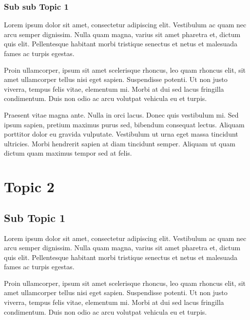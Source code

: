 \documentclass[12pt,a4paper]{report}
\begin{document}
\subsubsection{Sub sub Topic 1}

\begin{gbox}
Lorem ipsum dolor sit amet, consectetur adipiscing elit. Vestibulum ac quam nec arcu semper dignissim. Nulla quam magna, varius sit amet pharetra et, dictum quis elit. Pellentesque habitant morbi tristique senectus et netus et malesuada fames ac turpis egestas.
\end{gbox}

\begin{gbox}
Proin ullamcorper, ipsum sit amet scelerisque rhoncus, leo quam rhoncus elit, sit amet ullamcorper tellus nisi eget sapien. Suspendisse potenti. Ut non justo viverra, tempus felis vitae, elementum mi. Morbi at dui sed lacus fringilla condimentum. Duis non odio ac arcu volutpat vehicula eu et turpis.
\end{gbox}

\begin{gbox}
Praesent vitae magna ante. Nulla in orci lacus. Donec quis vestibulum mi. Sed ipsum sapien, pretium maximus purus sed, bibendum consequat lectus. Aliquam porttitor dolor eu gravida vulputate. Vestibulum ut urna eget massa tincidunt ultricies. Morbi hendrerit sapien at diam tincidunt semper. Aliquam ut quam dictum quam maximus tempor sed at felis.
\end{gbox}


\section{Topic 2}

\subsection{Sub Topic 1}

\begin{gbox}
Lorem ipsum dolor sit amet, consectetur adipiscing elit. Vestibulum ac quam nec arcu semper dignissim. Nulla quam magna, varius sit amet pharetra et, dictum quis elit. Pellentesque habitant morbi tristique senectus et netus et malesuada fames ac turpis egestas.
\end{gbox}

\begin{gbox}
Proin ullamcorper, ipsum sit amet scelerisque rhoncus, leo quam rhoncus elit, sit amet ullamcorper tellus nisi eget sapien. Suspendisse potenti. Ut non justo viverra, tempus felis vitae, elementum mi. Morbi at dui sed lacus fringilla condimentum. Duis non odio ac arcu volutpat vehicula eu et turpis.
\end{gbox}
\end{document}
